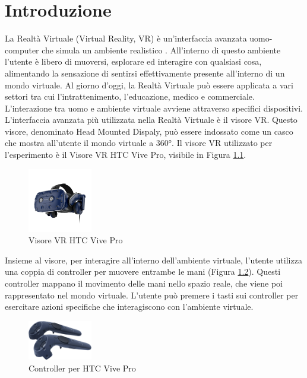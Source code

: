 \documentclass[target=bach,aauheader=]{thud}
\begin{document}
\chapter{Introduzione} %
\label{intro}
La Realtà Virtuale (Virtual Reality, VR) è un'interfaccia avanzata uomo-computer che simula un ambiente realistico \cite{Zheng}.
All'interno di questo ambiente l'utente è libero di muoversi, esplorare ed interagire con qualsiasi cosa, alimentando la sensazione di sentirsi effettivamente presente all'interno di un mondo virtuale.
Al giorno d'oggi, la Realtà Virtuale può essere applicata a vari settori tra cui l'intrattenimento, l'educazione, medico e commerciale. \\

L'interazione tra uomo e ambiente virtuale avviene attraverso specifici dispositivi.
L'interfaccia avanzata più utilizzata nella Realtà Virtuale è il visore VR. 
Questo visore, denominato Head Mounted Dispaly, può essere indossato come un casco che mostra all'utente il mondo virtuale a 360°.
Il visore VR utilizzato per l'esperimento è il Visore VR HTC Vive Pro, visibile in Figura \ref{fig:vive_pro}.

\begin{figure}[h]
    \centering
    \includegraphics[width=0.25\textwidth]{vive_pro}
    \caption{Visore VR HTC Vive Pro}
    \label{fig:vive_pro}
\end{figure}

Insieme al visore, per interagire all'interno dell'ambiente virtuale, l'utente utilizza una coppia di controller per muovere entrambe le mani (Figura \ref{fig:vive_contr}).
Questi controller mappano il movimento delle mani nello spazio reale, che viene poi rappresentato nel mondo virtuale. 
L'utente può premere i tasti sui controller per esercitare azioni specifiche che interagiscono con l'ambiente virtuale. \\

\begin{figure}[h]
    \centering
    \includegraphics[width=0.25\textwidth]{vive_contr}
    \caption{Controller per HTC Vive Pro}
    \label{fig:vive_contr}
\end{figure}
\end{document}
